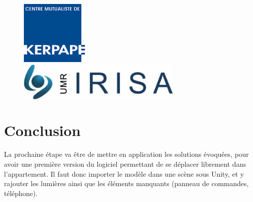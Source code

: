 \documentclass[a4paper,11pt]{article}
\begin{document}
\begin{figure}
\begin{minipage}{0.3\linewidth}
      \includegraphics[width=\textwidth]{1-PreEtude/img/logo_kerpape.png}
   \end{minipage}
   \begin{minipage}{0.3\linewidth}
      \includegraphics[width=\textwidth]{1-PreEtude/img/logo_irisa.jpg}
   \end{minipage}
\end{figure}

\pagebreak

\tableofcontents
\pagebreak


\pagebreak

\pagebreak

\pagebreak

\pagebreak

\pagebreak

\pagebreak

\section{Conclusion}
La prochaine étape va être de mettre en application les solutions évoquées, pour avoir une première version du logiciel permettant de se déplacer librement dans l'appartement. Il faut donc importer le modèle dans une scène sous Unity, et y rajouter les lumières ainsi que les éléments manquants (panneau de commandes, téléphone).

\pagebreak


\end{document}
